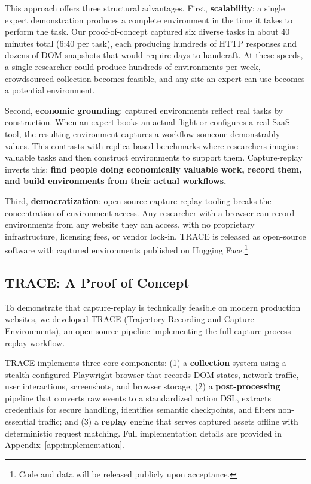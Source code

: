 \documentclass[letterpaper]{article}
\begin{document}
This approach offers three structural advantages. First, \textbf{scalability}: a single expert demonstration produces a complete environment in the time it takes to perform the task. Our proof-of-concept captured six diverse tasks in about 40 minutes total (6:40 per task), each producing hundreds of HTTP responses and dozens of DOM snapshots that would require days to handcraft. At these speeds, a single researcher could produce hundreds of environments per week, crowdsourced collection becomes feasible, and any site an expert can use becomes a potential environment.

Second, \textbf{economic grounding}: captured environments reflect real tasks by construction. When an expert books an actual flight or configures a real SaaS tool, the resulting environment captures a workflow someone demonstrably values. This contrasts with replica-based benchmarks where researchers imagine valuable tasks and then construct environments to support them. Capture-replay inverts this: \textbf{find people doing economically valuable work, record them, and build environments from their actual workflows.}

Third, \textbf{democratization}: open-source capture-replay tooling breaks the concentration of environment access. Any researcher with a browser can record environments from any website they can access, with no proprietary infrastructure, licensing fees, or vendor lock-in. TRACE is released as open-source software with captured environments published on Hugging Face.\footnote{Code and data will be released publicly upon acceptance.}

\subsection{TRACE: A Proof of Concept}

To demonstrate that capture-replay is technically feasible on modern production websites, we developed TRACE (Trajectory Recording and Capture Environments), an open-source pipeline implementing the full capture-process-replay workflow.

TRACE implements three core components: (1) a \textbf{collection} system using a stealth-configured Playwright browser that records DOM states, network traffic, user interactions, screenshots, and browser storage; (2) a \textbf{post-processing} pipeline that converts raw events to a standardized action DSL, extracts credentials for secure handling, identifies semantic checkpoints, and filters non-essential traffic; and (3) a \textbf{replay} engine that serves captured assets offline with deterministic request matching. Full implementation details are provided in Appendix~\ref{app:implementation}.
\end{document}
